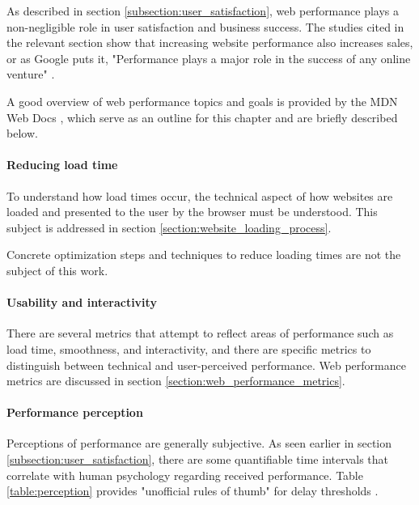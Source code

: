 
As described in section \ref{subsection:user_satisfaction}, web performance plays a non-negligible role in user satisfaction and business success.
The studies cited in the relevant section show that increasing website performance also increases sales, or as Google puts it, "Performance plays a major role in the success of any online venture" \cite{2020Pavic}.

A good overview of web performance topics and goals is provided by the MDN Web Docs \cite{2021MDNWhatIsPerformance}, which serve as an outline for this chapter and are briefly described below.


\paragraph{Reducing load time} %

To understand how load times occur, the technical aspect of how websites are loaded and presented to the user by the browser must be understood.
This subject is addressed in section \ref{section:website_loading_process}.

Concrete optimization steps and techniques to reduce loading times are not the subject of this work.


\paragraph{Usability and interactivity} %

There are several metrics that attempt to reflect areas of performance such as load time, smoothness, and interactivity, and there are specific metrics to distinguish between technical and user-perceived performance.
Web performance metrics are discussed in section \ref{section:web_performance_metrics}.


\paragraph{Performance perception} %

Perceptions of performance are generally subjective.
As seen earlier in section \ref{subsection:user_satisfaction}, there are some quantifiable time intervals that correlate with human psychology regarding received performance.
Table \ref{table:perception} provides "unofficial rules of thumb" for delay thresholds \cite{2013Grigorik}.

